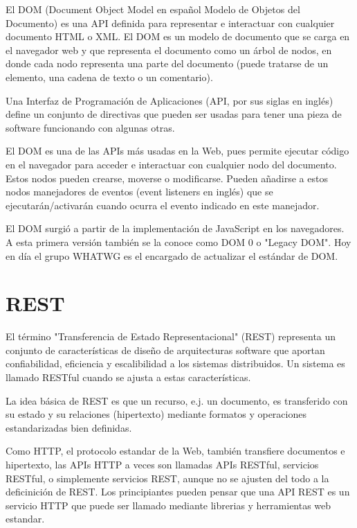El DOM (Document Object Model en español Modelo de Objetos del Documento) es una API definida para representar e interactuar con cualquier documento HTML o XML. El DOM es un modelo de documento que se carga en el navegador web y que representa el documento como un árbol de nodos, en donde cada nodo representa una parte del documento (puede tratarse de un elemento, una cadena de texto o un comentario).

\begin{remark}
Una Interfaz de Programación de Aplicaciones (API, por sus siglas en inglés) define un conjunto de directivas que pueden ser usadas para tener una pieza de software funcionando con algunas otras.
\end{remark}

El DOM es una de las APIs más usadas en la Web, pues permite ejecutar código en el navegador para acceder e interactuar con cualquier nodo del documento. Estos nodos pueden crearse, moverse o modificarse. Pueden añadirse a estos nodos manejadores de eventos (event listeners en inglés) que se ejecutarán/activarán cuando ocurra el evento indicado en este manejador.

El DOM surgió a partir de la implementación de JavaScript en los navegadores. A esta primera versión también se la conoce como DOM 0 o "Legacy DOM". Hoy en día el grupo WHATWG es el encargado de actualizar el estándar de DOM.


\section{REST}

\cite{mdn}El término "Transferencia de Estado Representacional" (REST) representa un conjunto de características de diseño de arquitecturas software que aportan confiabilidad, eficiencia y escalibilidad a los sistemas distribuidos. Un sistema es llamado RESTful cuando se ajusta a estas características.

La idea básica de REST es que un recurso, e.j. un documento, es transferido con su estado y su relaciones (hipertexto) mediante formatos y operaciones estandarizadas bien definidas.

Como HTTP, el protocolo estandar de la Web, también transfiere documentos e hipertexto, las APIs HTTP a veces son llamadas APIs RESTful, servicios RESTful, o simplemente servicios REST, aunque no se ajusten del todo a la deficinición de REST. Los principiantes pueden pensar que una API REST es un servicio HTTP que puede ser llamado mediante librerias y herramientas web estandar.

